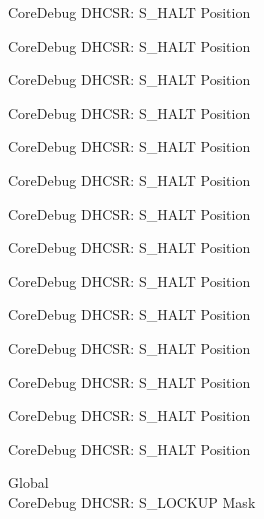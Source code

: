 \begin{DoxyRefList}
\label{deprecated__deprecated000171}%
%
Core\+Debug DHCSR\+: S\+\_\+\+HALT Position 

\label{deprecated__deprecated000256}%
%
Core\+Debug DHCSR\+: S\+\_\+\+HALT Position 

\label{deprecated__deprecated000313}%
%
Core\+Debug DHCSR\+: S\+\_\+\+HALT Position 

\label{deprecated__deprecated000389}%
%
Core\+Debug DHCSR\+: S\+\_\+\+HALT Position 

\label{deprecated__deprecated000476}%
%
Core\+Debug DHCSR\+: S\+\_\+\+HALT Position 

\label{deprecated__deprecated000578}%
%
Core\+Debug DHCSR\+: S\+\_\+\+HALT Position 

\label{deprecated__deprecated000703}%
%
Core\+Debug DHCSR\+: S\+\_\+\+HALT Position 

\label{deprecated__deprecated000795}%
%
Core\+Debug DHCSR\+: S\+\_\+\+HALT Position 

\label{deprecated__deprecated000849}%
%
Core\+Debug DHCSR\+: S\+\_\+\+HALT Position 

\label{deprecated__deprecated000934}%
%
Core\+Debug DHCSR\+: S\+\_\+\+HALT Position 

\label{deprecated__deprecated000991}%
%
Core\+Debug DHCSR\+: S\+\_\+\+HALT Position 

\label{deprecated__deprecated001067}%
%
Core\+Debug DHCSR\+: S\+\_\+\+HALT Position 

\label{deprecated__deprecated001154}%
%
Core\+Debug DHCSR\+: S\+\_\+\+HALT Position 

\label{deprecated__deprecated001256}%
%
Core\+Debug DHCSR\+: S\+\_\+\+HALT Position  
\item[Global \doxylink{group___c_m_s_i_s___core_debug_ga7b67e4506d7f464ef5dafd6219739756}{Core\+Debug\+\_\+\+DHCSR\+\_\+\+S\+\_\+\+LOCKUP\+\_\+\+Msk} ]\hfill \\
\label{deprecated__deprecated000022}%
%
Core\+Debug DHCSR\+: S\+\_\+\+LOCKUP Mask 


\end{DoxyRefList}

